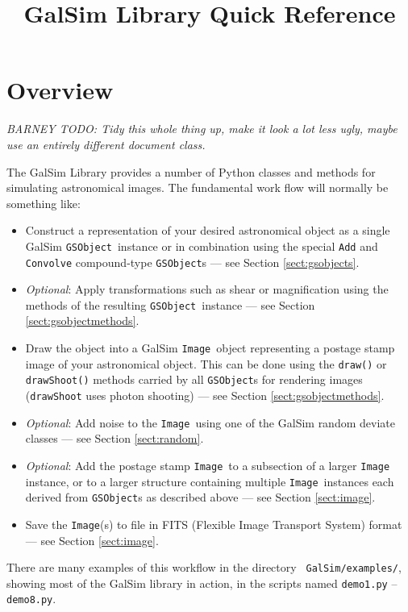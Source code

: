 \documentclass[preprint,11pt]{aastex}
\newcommand{\gsobject}{{\tt GSObject}}
\newcommand{\image}{{\tt Image}}
\begin{document}
\setlength{\parskip}{2.0ex plus 0.5ex minus 0.5ex}
\setlength{\parindent}{0cm} 

\title{GalSim Library Quick Reference}

\section{Overview}

\emph{BARNEY TODO: Tidy this whole thing up, make it look a lot less ugly,
maybe use an entirely different document class.}

The GalSim Library provides a number of Python classes and methods for
simulating astronomical images.  The fundamental work flow will
normally be something like:
\begin{itemize}

\item Construct a representation of your desired astronomical object
  as a single GalSim \gsobject~instance or in combination using the
  special {\tt Add} and {\tt Convolve} compound-type \gsobject s ---
  see Section \ref{sect:gsobjects}.
\item \emph{Optional}: Apply transformations such as shear or
  magnification using the methods of the resulting \gsobject~instance
  --- see Section \ref{sect:gsobjectmethods}.
\item Draw the object into a GalSim \image~object representing a
  postage stamp image of your astronomical object.  This can be done
  using the {\tt draw()} or {\tt drawShoot()} methods carried by all
  \gsobject s for rendering images ({\tt drawShoot} uses photon
  shooting) --- see Section \ref{sect:gsobjectmethods}.
\item \emph{Optional}: Add noise to the \image~using one of the GalSim
  random deviate classes --- see Section \ref{sect:random}.
\item \emph{Optional}: Add the postage stamp \image~to a subsection of
  a larger \image~ instance, or to a larger structure containing
  multiple \image~instances each derived from \gsobject s as described
  above --- see Section \ref{sect:image}.
\item Save the \image (s) to file in FITS (Flexible Image Transport
  System) format --- see Section \ref{sect:image}.
\end{itemize}

There are many examples of this workflow in the directory {\tt
  GalSim/examples/}, showing most of the GalSim library in
action, in the scripts named
\texttt{demo1.py} -- \texttt{demo8.py}.  
\end{document}
